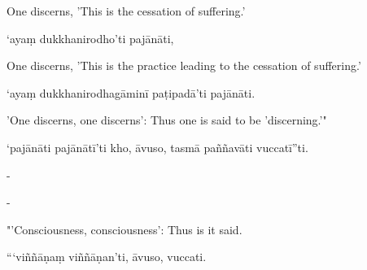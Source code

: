 \begin{samepage}
\begin{leftcolumn*}
One discerns, 'This is the cessation of suffering.'
\end{leftcolumn*}

\begin{rightcolumn}
‘ayaṃ dukkhanirodho’ti pajānāti,
\end{rightcolumn}
\end{samepage}

\begin{samepage}
\begin{leftcolumn*}
One discerns, 'This is the practice leading to the cessation of suffering.'
\end{leftcolumn*}

\begin{rightcolumn}
‘ayaṃ dukkhanirodhagāminī paṭipadā’ti pajānāti.
\end{rightcolumn}
\end{samepage}

\begin{samepage}
\begin{leftcolumn*}
'One discerns, one discerns': Thus one is said to be 'discerning.'"
\end{leftcolumn*}

\begin{rightcolumn}
‘pajānāti pajānātī’ti kho, āvuso, tasmā paññavāti vuccatī”ti.
\end{rightcolumn}
\end{samepage}

\begin{samepage}
\begin{leftcolumn*}
-
\end{leftcolumn*}

\begin{rightcolumn}
-
\end{rightcolumn}
\end{samepage}

\begin{samepage}
\begin{leftcolumn*}
"'Consciousness, consciousness': Thus is it said.
\end{leftcolumn*}

\begin{rightcolumn}
“‘viññāṇaṃ viññāṇan’ti, āvuso, vuccati.
\end{rightcolumn}
\end{samepage}

